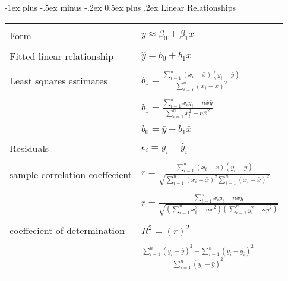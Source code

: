 \documentclass[10pt,landscape]{article}
\makeatletter
\renewcommand{\section}{\@startsection{section}{1}{0mm}%
                                {-1ex plus -.5ex minus -.2ex}%
                                {0.5ex plus .2ex}%
                                {\normalfont\large\bfseries}}
\makeatother
\begin{document}
\begin{multicols}{2}
\section{Linear Relationships}
\begin{tabular}{@{}ll@{}}
        & \\
Form & $y \approx \beta_0 + \beta_1 x$ \\
        & \\
Fitted linear relationship & $\hat{y} = b_0 + b_1 x$ \\
        & \\
Least squares estimates & $b_1 = \frac{\sum_{i = 1}^n (x_i - \bar{x})(y_i - \bar{y})}{\sum_{i=1}^n (x_i - \bar{x})^2}$ \\
        & \\
                        & $b_1 = \frac{ \sum_{i = 1}^n x_i y_i - n \bar{x} \bar{y} }{ \sum_{i = 1}^n x_i^2 - n \bar{x}^2 } $ \\
        & \\
                        & $b_0 = \bar{y} - b_1 \bar{x}$ \\
        & \\
Residuals & $e_i = y_i - \hat{y}_i $ \\
        & \\
sample correlation coeffecient & $r = \frac{\sum_{i=1}^n \left(x_i - \bar{x} \right)\left(y_i - \bar{y}\right)}{\sqrt{\sum_{i=1}^n \left( x_i - \bar{x} \right)^2 \sum_{i=1}^n \left(x_i - \bar{x} \right)^2}}$ \\
        & \\
                               & $r = \frac{\sum_{i=1}^n x_i y_i - n \bar{x} \bar{y}}{\sqrt{\left(\sum_{i=1}^n x_i^2 - n \bar{x}^2\right)\left(\sum_{i=1}^n y_i^2 - n\bar{y}^2\right)}}$ \\
        & \\
coeffecient of determination & $R^2 = (r)^2$ \\
        & \\
                             & $\frac{\sum_{i=1}^n \left(y_i - \bar{y} \right)^2 - \sum_{i=1}^n \left(y_i - \hat{y}_i\right)^2}{\sum_{i=1}^n \left(y_i - \bar{y}\right)^2}$ \\
        & \\
\end{tabular}

\vspace{.2cm}


\end{multicols}
\end{document}

